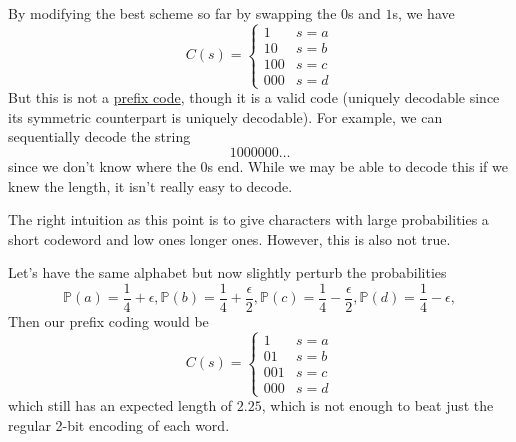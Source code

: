     \begin{example}
      \label{ex:swapping-symbols-in-a-code}
      By modifying the best scheme so far by swapping the $0$s and $1$s, we have 
        \begin{equation}
          C (s) = \begin{cases} 1 & s = a \\ 10 & s = b \\ 100 & s = c \\ 000 & s = d \end{cases}
        \end{equation}
        But this is not a \hyperref[def:prefix-code]{prefix code}, though it is a valid code (uniquely decodable since its symmetric counterpart is uniquely decodable). For example, we can sequentially decode the string 
        \begin{equation}
          1000000\ldots 
        \end{equation}
        since we don't know where the $0$s end. While we may be able to decode this if we knew the length, it isn't really easy to decode. 
    \end{example}

    The right intuition as this point is to give characters with large probabilities a short codeword and low ones longer ones. However, this is also not true. 

    \begin{example}
      \label{ex:perturbing-the-source-probabilities}
      Let's have the same alphabet but now slightly perturb the probabilities 
      \begin{equation}
        \mathbb{P}(a) = \frac{1}{4} + \epsilon,
        \mathbb{P}(b) = \frac{1}{4} + \frac{\epsilon}{2},
        \mathbb{P}(c) = \frac{1}{4} - \frac{\epsilon}{2},
        \mathbb{P}(d) = \frac{1}{4} - \epsilon,
      \end{equation}
      Then our prefix coding would be 
      \begin{equation}
        C (s) = \begin{cases} 1 & s = a \\ 01 & s = b \\ 001 & s = c \\ 000 & s = d \end{cases}
      \end{equation}
      which still has an expected length of $2.25$, which is not enough to beat just the regular 2-bit encoding of each word. 
    \end{example}

